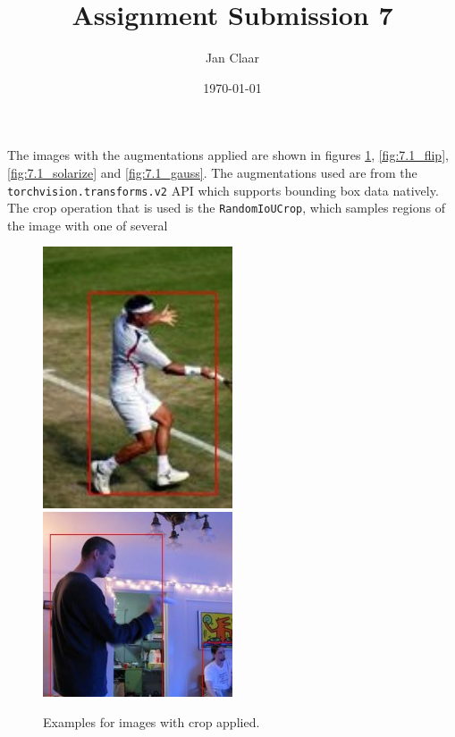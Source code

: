 \documentclass[
    headings=optiontohead,              %
    12pt,                               %
    DIV=13,                             %
    twoside=false,                      %
    open=right,                         %
    BCOR=00mm,                          %
    toc=bibliographynumbered,            %
    parskip=half,                       %
]{scrarticle}
\title{Assignment Submission 7}
\author{Jan Claar}
\date{\today}
\begin{document}
    \head 


    The images with the augmentations applied are shown in figures \ref{fig:7.1_crop}, \ref{fig:7.1_flip}, \ref{fig:7.1_solarize} and \ref{fig:7.1_gauss}. The augmentations used are from the \texttt{torchvision.transforms.v2} API which supports bounding box data natively. The crop operation that is used is the \texttt{RandomIoUCrop}, which samples regions of the image with one of several 
    \begin{figure}[htpb]
        \centering
        \includegraphics[width=0.5\textwidth]{../00000431.jpg}
        \includegraphics[width=0.5\textwidth]{../00004823.jpg}
        \caption{Examples for images with crop applied.}
        \label{fig:7.1_crop}
    \end{figure}
\end{document}
